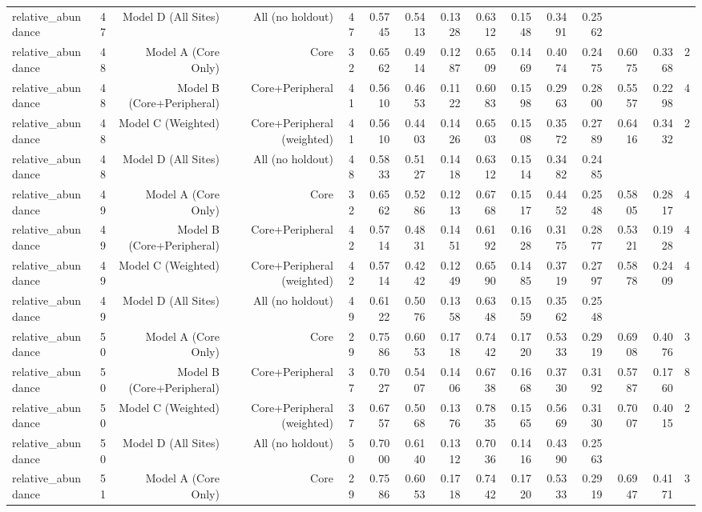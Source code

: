 {\begin{longtable}{lrrrrrrrrrrrrrr}
  relative\_abundance & 47 & Model D (All Sites) & All (no holdout) & 47 & 0.5745 & 0.5413 & 0.1328 & 0.6312 & 0.1548 & 0.3491 & 0.2562 &  &  &  \\
  relative\_abundance & 48 & Model A (Core Only) & Core & 32 & 0.6562 & 0.4914 & 0.1287 & 0.6509 & 0.1469 & 0.4074 & 0.2475 & 0.6075 & 0.3368 & 2 \\
  relative\_abundance & 48 & Model B (Core+Peripheral) & Core+Peripheral & 41 & 0.5610 & 0.4653 & 0.1122 & 0.6083 & 0.1598 & 0.2963 & 0.2800 & 0.5557 & 0.2298 & 4 \\
  relative\_abundance & 48 & Model C (Weighted) & Core+Peripheral (weighted) & 41 & 0.5610 & 0.4403 & 0.1426 & 0.6503 & 0.1508 & 0.3572 & 0.2789 & 0.6416 & 0.3432 & 2 \\
  relative\_abundance & 48 & Model D (All Sites) & All (no holdout) & 48 & 0.5833 & 0.5127 & 0.1418 & 0.6312 & 0.1514 & 0.3482 & 0.2485 &  &  &  \\
  relative\_abundance & 49 & Model A (Core Only) & Core & 32 & 0.6562 & 0.5286 & 0.1213 & 0.6768 & 0.1517 & 0.4452 & 0.2548 & 0.5805 & 0.2817 & 4 \\
  relative\_abundance & 49 & Model B (Core+Peripheral) & Core+Peripheral & 42 & 0.5714 & 0.4831 & 0.1451 & 0.6192 & 0.1628 & 0.3175 & 0.2877 & 0.5321 & 0.1928 & 4 \\
  relative\_abundance & 49 & Model C (Weighted) & Core+Peripheral (weighted) & 42 & 0.5714 & 0.4242 & 0.1249 & 0.6590 & 0.1485 & 0.3719 & 0.2797 & 0.5878 & 0.2409 & 4 \\
  relative\_abundance & 49 & Model D (All Sites) & All (no holdout) & 49 & 0.6122 & 0.5076 & 0.1358 & 0.6348 & 0.1559 & 0.3562 & 0.2548 &  &  &  \\
  relative\_abundance & 50 & Model A (Core Only) & Core & 29 & 0.7586 & 0.6053 & 0.1718 & 0.7442 & 0.1720 & 0.5333 & 0.2919 & 0.6908 & 0.4076 & 3 \\
  relative\_abundance & 50 & Model B (Core+Peripheral) & Core+Peripheral & 37 & 0.7027 & 0.5407 & 0.1406 & 0.6738 & 0.1668 & 0.3730 & 0.3192 & 0.5787 & 0.1760 & 8 \\
  relative\_abundance & 50 & Model C (Weighted) & Core+Peripheral (weighted) & 37 & 0.6757 & 0.5068 & 0.1376 & 0.7835 & 0.1565 & 0.5669 & 0.3130 & 0.7007 & 0.4015 & 2 \\
  relative\_abundance & 50 & Model D (All Sites) & All (no holdout) & 50 & 0.7000 & 0.6140 & 0.1312 & 0.7036 & 0.1416 & 0.4390 & 0.2563 &  &  &  \\
  relative\_abundance & 51 & Model A (Core Only) & Core & 29 & 0.7586 & 0.6053 & 0.1718 & 0.7442 & 0.1720 & 0.5333 & 0.2919 & 0.6947 & 0.4171 & 3 \\

\end{longtable}}
